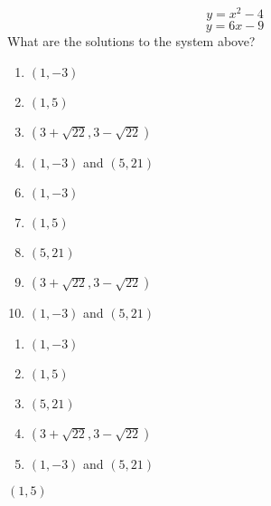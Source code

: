 
$$y=x^2-4$$ $$y=6x-9$$
What are the solutions to the system above?


\ifsat
	\begin{enumerate}[label=\Alph*)]
		\item $(1,-3) $ 
		\item $(1,5) $ %
		\item $(3+\sqrt{22},3-\sqrt{22}) $
		\item $(1,-3)$ and $(5,21)$ 
	\end{enumerate}
\else
\fi

\ifacteven
	\begin{enumerate}[label=\textbf{\Alph*.},itemsep=\fill,align=left]
		\setcounter{enumii}{5}
		\item $(1,-3) $ 
		\item $(1,5) $ %
		\item $(5,21) $
		\addtocounter{enumii}{1}
		\item $(3+\sqrt{22},3-\sqrt{22}) $
		\item $(1,-3)$ and $(5,21)$ 
	\end{enumerate}
\else
\fi

\ifactodd
	\begin{enumerate}[label=\textbf{\Alph*.},itemsep=\fill,align=left]
		\item $(1,-3) $ 
		\item $(1,5) $ %
		\item $(5,21) $
		\item $(3+\sqrt{22},3-\sqrt{22}) $
		\item $(1,-3)$ and $(5,21)$ 
	\end{enumerate}
\else
\fi

\ifgridin
 $(1,5) $ %
		
\else
\fi

